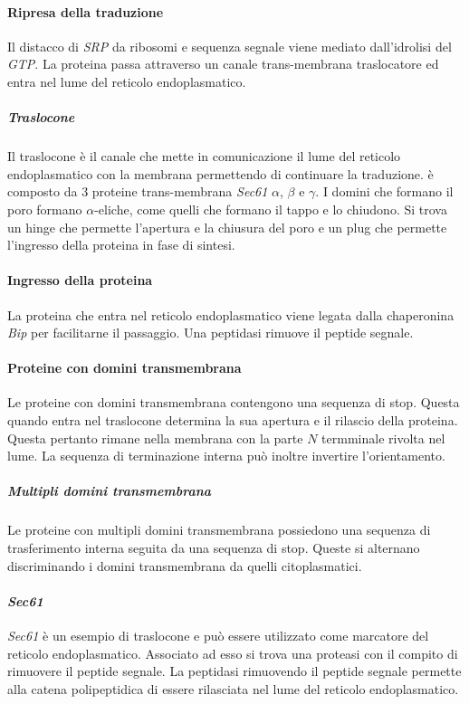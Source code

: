 			\paragraph{Ripresa della traduzione}
			Il distacco di \emph{SRP} da ribosomi e sequenza segnale viene mediato dall'idrolisi del \emph{GTP}.
			La proteina passa attraverso un canale trans-membrana traslocatore ed entra nel lume del reticolo endoplasmatico.

				\subparagraph{Traslocone}
				Il traslocone \`e il canale che mette in comunicazione il lume del reticolo endoplasmatico con la membrana permettendo di continuare la traduzione.
				\`e composto da $3$ proteine trans-membrana \emph{Sec61} $\alpha$, $\beta$ e $\gamma$.
				I domini che formano il poro formano $\alpha$-eliche, come quelli che formano il tappo e lo chiudono.
				Si trova un hinge che permette l'apertura e la chiusura del poro e un plug che permette l'ingresso della proteina in fase di sintesi.

			\paragraph{Ingresso della proteina}
			La proteina che entra nel reticolo endoplasmatico viene legata dalla chaperonina \emph{Bip} per facilitarne il passaggio.
			Una peptidasi rimuove il peptide segnale.

			\paragraph{Proteine con domini transmembrana}
			Le proteine con domini transmembrana contengono una sequenza di stop.
			Questa quando entra nel traslocone determina la sua apertura e il rilascio della proteina.
			Questa pertanto rimane nella membrana con la parte $N$ termminale rivolta nel lume.
			La sequenza di terminazione interna pu\`o inoltre invertire l'orientamento.
			
				\subparagraph{Multipli domini transmembrana}
				Le proteine con multipli domini transmembrana possiedono una sequenza di trasferimento interna seguita da una sequenza di stop.
				Queste si alternano discriminando i domini transmembrana da quelli citoplasmatici.

			\paragraph{\emph{Sec61}}
			\emph{Sec61} \`e un esempio di traslocone e pu\`o essere utilizzato come marcatore del reticolo endoplasmatico.
			Associato ad esso si trova una proteasi con il compito di rimuovere il peptide segnale.
			La peptidasi rimuovendo il peptide segnale permette alla catena polipeptidica di essere rilasciata nel lume del reticolo endoplasmatico.

